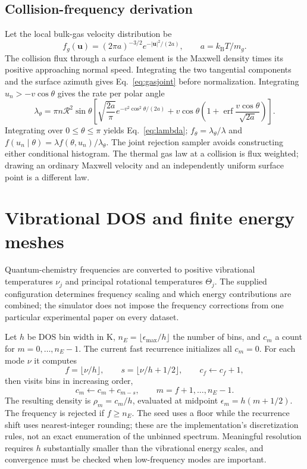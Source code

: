 \documentclass[10pt,a4paper]{article}
\newcommand{\kb}{k_{\mathrm B}}
\newcommand{\erf}{\operatorname{erf}}
\begin{document}
\subsection{Collision-frequency derivation}
Let the local bulk-gas velocity distribution be
\[
 f_g(\mathbf u)=(2\pi a)^{-3/2}e^{-|\mathbf u|^2/(2a)},\qquad
 a=\kb T/m_g.
\]
The collision flux through a surface element is the Maxwell density times its
positive approaching normal speed. Integrating the two tangential components
and the surface azimuth gives Eq.~\eqref{eq:gasjoint} before normalization.
Integrating $u_n>-v\cos\theta$ gives the rate per polar angle
\begin{equation}
 \lambda_\theta=\pi n\mathcal R^2\sin\theta
 \left[
 \sqrt{\frac{2a}{\pi}}e^{-v^2\cos^2\theta/(2a)}
 +v\cos\theta\left(1+\erf\frac{v\cos\theta}{\sqrt{2a}}\right)
 \right].
\end{equation}
Integrating over $0\leq\theta\leq\pi$ yields Eq.~\eqref{eq:lambda};
$f_\theta=\lambda_\theta/\lambda$ and
$f(u_n\mid\theta)=\lambda f(\theta,u_n)/\lambda_\theta$.
The joint rejection sampler avoids constructing either conditional histogram.
The thermal gas law at a collision is flux weighted; drawing an ordinary
Maxwell velocity and an independently uniform surface point is a different law.

\clearpage
\section{Vibrational DOS and finite energy meshes}\label{app:dos}
Quantum-chemistry frequencies are converted to positive vibrational temperatures
$\nu_j$ and principal rotational temperatures $\Theta_j$. The supplied
configuration determines frequency scaling and which energy contributions are
combined; the simulator does not impose the frequency corrections from one
particular experimental paper on every dataset.

Let $h$ be DOS bin width in K, $n_E=\lfloor\epsilon_{\max}/h\rfloor$ the
number of bins, and $c_m$ a count for $m=0,\ldots,n_E-1$. The current fast
recurrence initializes all $c_m=0$. For each mode $\nu$ it computes
\[
 f=\lfloor\nu/h\rfloor,\qquad s=\lfloor\nu/h+1/2\rfloor,
 \qquad c_f\gets c_f+1,
\]
then visits bins in increasing order,
\[
 c_m\gets c_m+c_{m-s},\qquad m=f+1,\ldots,n_E-1.
\]
The resulting density is $\rho_m=c_m/h$, evaluated at midpoint
$\epsilon_m=h(m+1/2)$. The frequency is rejected if $f\geq n_E$.
The seed uses a floor while the recurrence shift uses nearest-integer rounding;
these are the implementation's discretization rules, not an exact enumeration
of the unbinned spectrum. Meaningful resolution requires $h$ substantially
smaller than the vibrational energy scales, and convergence must be checked
when low-frequency modes are important.
\end{document}
